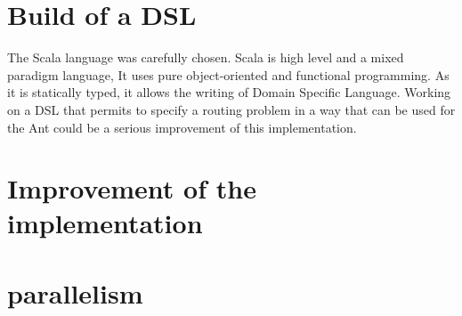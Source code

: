 \section{Build of a DSL}
The Scala language was carefully chosen. Scala is high level and a mixed paradigm language, It uses pure object-oriented and functional programming. As it is statically typed, it allows the writing of Domain Specific Language. Working on a DSL that permits to specify a routing problem in a way that can be used for the Ant could be a serious improvement of this implementation.
\section{Improvement of the implementation}
\section{parallelism}